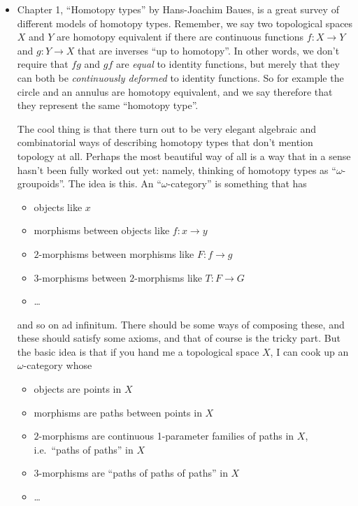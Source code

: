 \documentclass{article}
\def\tightlist{}
\begin{document}
\begin{itemize}
\item
  Chapter 1, ``Homotopy types'' by Hans-Joachim Baues, is a great survey
  of different models of homotopy types. Remember, we say two
  topological spaces \(X\) and \(Y\) are homotopy equivalent if there
  are continuous functions \(f\colon X\to Y\) and \(g\colon Y\to X\)
  that are inverses ``up to homotopy''. In other words, we don't require
  that \(fg\) and \(gf\) are \emph{equal} to identity functions, but
  merely that they can both be \emph{continuously deformed} to identity
  functions. So for example the circle and an annulus are homotopy
  equivalent, and we say therefore that they represent the same
  ``homotopy type''.

  The cool thing is that there turn out to be very elegant algebraic and
  combinatorial ways of describing homotopy types that don't mention
  topology at all. Perhaps the most beautiful way of all is a way that
  in a sense hasn't been fully worked out yet: namely, thinking of
  homotopy types as ``\(\omega\)-groupoids''. The idea is this. An
  ``\(\omega\)-category'' is something that has

  \begin{itemize}
  \tightlist
  \item
    objects like \(x\)
  \item
    morphisms between objects like \(f\colon x\to y\)
  \item
    \(2\)-morphisms between morphisms like \(F\colon f\to g\)
  \item
    \(3\)-morphisms between \(2\)-morphisms like \(T\colon F\to G\)
  \item
    \ldots{}
  \end{itemize}

  and so on ad infinitum. There should be some ways of composing these,
  and these should satisfy some axioms, and that of course is the tricky
  part. But the basic idea is that if you hand me a topological space
  \(X\), I can cook up an \(\omega\)-category whose

  \begin{itemize}
  \tightlist
  \item
    objects are points in \(X\)
  \item
    morphisms are paths between points in \(X\)
  \item
    \(2\)-morphisms are continuous 1-parameter families of paths in
    \(X\), i.e.~``paths of paths'' in \(X\)
  \item
    \(3\)-morphisms are ``paths of paths of paths'' in \(X\)
  \item
    \ldots{}
  \end{itemize}


\end{itemize}
\end{document}
